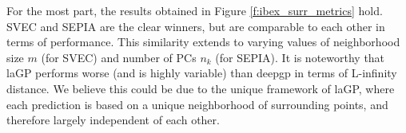 \documentclass[11pt]{article}
\begin{document}
{\color{red} For the most part, the results obtained in Figure
\ref{f:ibex_surr_metrics} hold. SVEC and SEPIA are the clear winners, but are
comparable to each other in terms of performance. This similarity extends to
varying values of neighborhood size $m$ (for SVEC) and number of PCs $n_k$
(for SEPIA). It is noteworthy that {\sf laGP} performs worse (and is highly
variable) than {\sf deepgp} in terms of L-infinity distance. We believe this
could be due to the unique framework of {\sf laGP}, where each prediction is
based on a unique neighborhood of surrounding points, and therefore largely
independent of each other.}
\end{document}

